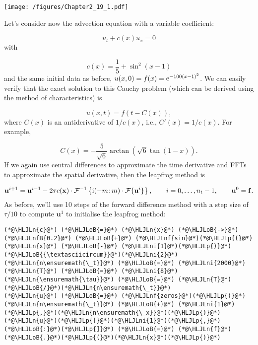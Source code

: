 \documentclass[12pt,landscape]{article}
\newcommand{\HLJLn}[1]{#1}
\newcommand{\HLJLnf}[1]{\textcolor[RGB]{66,102,213}{#1}}
\newcommand{\HLJLnfB}[1]{\textcolor[RGB]{59,151,46}{#1}}
\newcommand{\HLJLni}[1]{\textcolor[RGB]{59,151,46}{#1}}
\newcommand{\HLJLoB}[1]{\textcolor[RGB]{102,102,102}{\textbf{#1}}}
\newcommand{\HLJLp}[1]{#1}
\begin{document}
{\texttt{[image: /figures/Chapter2\_19\_1.pdf]}

Let's consider now the advection equation with a variable coefficient:

\[
u_t + c(x)u_x = 0
\]
with 

\[
c(x) = \frac{1}{5} + \sin^2(x-1)
\]
and the same initial data as before, $u(x,0) = f(x) = {\rm e}^{-100(x-1)^2}$.  We can easily verify that the exact solution to this Cauchy problem (which can be derived using the method of characteristics) is 

\[
u(x,t) = f\left(t - C(x)  \right),
\]
where $C(x)$ is an antiderivative of $1/c(x)$, i.e., $C'(x) = 1/c(x)$.    For example,

\[
C(x) = -\frac{5}{\sqrt{6}}\arctan \left(\sqrt{6}\tan(1-x)  \right).
\]
If we again use central differences to approximate the time derivative and FFTs to approximate the spatial derivative, then the leapfrog method is

\[
\mathbf{u}^{i+1} = \mathbf{u}^{i-1} - 2\tau c(\mathbf{x})\cdot \mathcal{F}^{-1}\left\lbrace {\rm i}(-m\!:\!m)\cdot\mathcal{F}\lbrace \mathbf{u}^{i} \rbrace\right\rbrace, \qquad i = 0, \ldots, n_t-1, \qquad \mathbf{u}^0 = \mathbf{f}.
\]
As before, we'll use 10 steps of the forward difference method with a step size of $\tau/10$ to compute $\mathbf{u}^{1}$ to initialise the leapfrog method:


\begin{lstlisting}
(*@\HLJLn{c}@*) (*@\HLJLoB{=}@*) (*@\HLJLn{x}@*) (*@\HLJLoB{->}@*) (*@\HLJLnfB{0.2}@*) (*@\HLJLoB{+}@*) (*@\HLJLnf{sin}@*)(*@\HLJLp{(}@*)(*@\HLJLn{x}@*) (*@\HLJLoB{-}@*) (*@\HLJLni{1}@*)(*@\HLJLp{)}@*)(*@\HLJLoB{{\textasciicircum}}@*)(*@\HLJLni{2}@*)
(*@\HLJLn{n\ensuremath{\_t}}@*) (*@\HLJLoB{=}@*) (*@\HLJLni{2000}@*)
(*@\HLJLn{T}@*) (*@\HLJLoB{=}@*) (*@\HLJLni{8}@*)
(*@\HLJLn{\ensuremath{\tau}}@*) (*@\HLJLoB{=}@*) (*@\HLJLn{T}@*)(*@\HLJLoB{/}@*)(*@\HLJLn{n\ensuremath{\_t}}@*)
(*@\HLJLn{u}@*) (*@\HLJLoB{=}@*) (*@\HLJLnf{zeros}@*)(*@\HLJLp{(}@*)(*@\HLJLn{n\ensuremath{\_t}}@*) (*@\HLJLoB{+}@*) (*@\HLJLni{1}@*)(*@\HLJLp{,}@*)(*@\HLJLn{n\ensuremath{\_x}}@*)(*@\HLJLp{)}@*)
(*@\HLJLn{u}@*)(*@\HLJLp{[}@*)(*@\HLJLni{1}@*)(*@\HLJLp{,}@*)(*@\HLJLoB{:}@*)(*@\HLJLp{]}@*) (*@\HLJLoB{=}@*) (*@\HLJLn{f}@*)(*@\HLJLoB{.}@*)(*@\HLJLp{(}@*)(*@\HLJLn{x}@*)(*@\HLJLp{)}@*) 


\end{lstlisting}}
\end{document}
